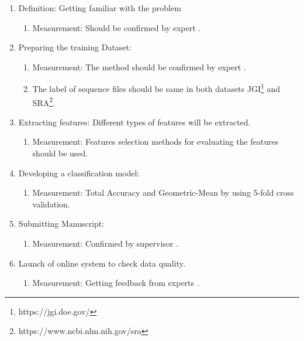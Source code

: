 \documentclass[a4paper]{article}
\newcommand{\remeet}{{\color{red} \dag}}
\newcommand{\deadline}[1]{{\color{blue} \hfill{#1} }}
\begin{document}
    \begin{enumerate}
        \item Definition: Getting familiar with the problem %
        \begin{enumerate}
            \item Measurement: Should be confirmed by expert\remeet.
        \end{enumerate}
        \item Preparing the training Dataset:%
        \begin{enumerate}
            \item Measurement: The method should be confirmed by expert\remeet.
            \item The label of sequence files should be same in both datasets JGI\footnote{https://jgi.doe.gov/} and SRA\footnote{https://www.ncbi.nlm.nih.gov/sra}.\@
        \end{enumerate}
        \item Extracting features: Different types of features will be extracted. %
        \begin{enumerate}
            \item Measurement: Features selection methods for evaluating the features should be used.
        \end{enumerate}
        \item Developing a classification model: %
        \begin{enumerate}
            \item Measurement: Total Accuracy and Geometric-Mean by using 5-fold cross validation.
        \end{enumerate}
        \item Submitting Manuscript: %
        \begin{enumerate}
            \item Measurement: Confirmed by supervisor\remeet.
        \end{enumerate}
        \item Launch of online system to check data quality. %
        \begin{enumerate}
            \item Measurement: Getting feedback from experts\remeet.
        \end{enumerate}
    \end{enumerate}
\end{document}
